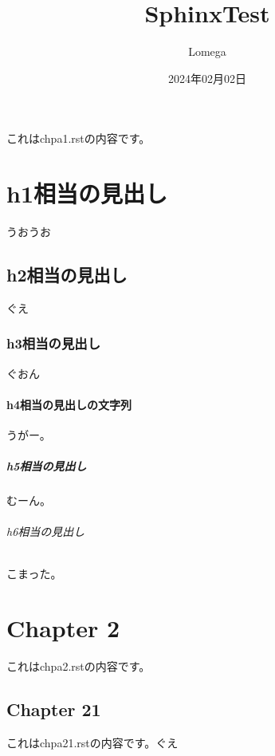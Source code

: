 \documentclass[letterpaper,10pt,dvipdfmx]{sphinxmanual}
\title{Sphinx\sphinxhyphen{}Test}
\date{2024年02月02日}
\author{Lomega}
\begin{document}
\pagestyle{empty}
\sphinxmaketitle
\pagestyle{plain}
\sphinxtableofcontents
\pagestyle{normal}
\label{\detokenize{index::doc}}


\sphinxstepscope

\sphinxAtStartPar
これはchpa1.rstの内容です。


\chapter{h1相当の見出し}
\label{\detokenize{chap1:h1}}\label{\detokenize{chap1::doc}}
\sphinxAtStartPar
うおうお


\section{h2相当の見出し}
\label{\detokenize{chap1:h2}}
\sphinxAtStartPar
ぐえ


\subsection{h3相当の見出し}
\label{\detokenize{chap1:h3}}
\sphinxAtStartPar
ぐおん


\subsubsection{h4相当の見出しの文字列}
\label{\detokenize{chap1:h4}}
\sphinxAtStartPar
うがー。


\paragraph{h5相当の見出し}
\label{\detokenize{chap1:h5}}
\sphinxAtStartPar
むーん。


\subparagraph{h6相当の見出し}
\label{\detokenize{chap1:h6}}
\sphinxAtStartPar
こまった。

\sphinxstepscope


\chapter{Chapter 2}
\label{\detokenize{chap2:chapter-2}}\label{\detokenize{chap2::doc}}
\sphinxAtStartPar
これはchpa2.rstの内容です。

\sphinxstepscope


\section{Chapter 2\sphinxhyphen{}1}
\label{\detokenize{chapter2/chap2-1:chapter-2-1}}\label{\detokenize{chapter2/chap2-1::doc}}
\sphinxAtStartPar
これはchpa2\sphinxhyphen{}1.rstの内容です。ぐえ
\end{document}
